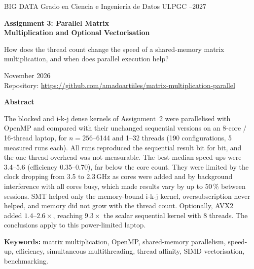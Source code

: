 \documentclass[11pt,a4paper]{article}
\newcommand{\AuthorName}{Amado Artiles Rodríguez}
\newcommand{\RepoURL}{https://github.com/amadoartiiles/matrix-multiplication-parallel}
\begin{document}
\thispagestyle{empty}
\begin{tcolorbox}[enhanced,colback=accent,colframe=accent,coltext=white,arc=3pt,
  left=14pt,right=14pt,top=12pt,bottom=12pt]
{\small BIG DATA \quad\textperiodcentered\quad Grado en Ciencia e Ingeniería de Datos \quad\textperiodcentered\quad ULPGC \quad\textperiodcentered{}--2027}

\vspace{8pt}
{\LARGE\bfseries Assignment 3: Parallel Matrix\\[2pt] Multiplication and Optional Vectorisation}

\vspace{8pt}
{\large How does the thread count change the speed of a shared-memory matrix multiplication,
and when does parallel execution help?}
\end{tcolorbox}

\vspace{4pt}
\noindent{\large\bfseries \AuthorName}\hfill{\color{codecomment}November 2026}\\
{\small Repository: \url{\RepoURL}}

\vspace{6pt}
\begin{infobox}
{\color{accent}\bfseries Abstract}\par\vspace{3pt}
The blocked and i-k-j dense kernels of Assignment~2 were parallelised with OpenMP and compared
with their unchanged sequential versions on an 8-core / 16-thread laptop, for $n=256$--6144
and 1--32 threads (190 configurations, 5 measured runs each). All runs reproduced the
sequential result bit for bit, and the one-thread overhead was not measurable. The best
median speed-ups were 3.4--5.6 (efficiency 0.35--0.70), far below the core count. They were limited by the
clock dropping from 3.5 to 2.3\,GHz as cores were added and by background interference with
all cores busy, which made results vary by up to 50\,\% between sessions. SMT helped only the
memory-bound i-k-j kernel, oversubscription never helped, and memory did not grow with the
thread count. Optionally, AVX2 added $1.4$--$2.6\times$, reaching $9.3\times$ the scalar
sequential kernel with 8 threads. The conclusions apply to this power-limited laptop.

\vspace{4pt}
{\small\textbf{Keywords:} matrix multiplication, OpenMP, shared-memory parallelism, speed-up,
efficiency, simultaneous multithreading, thread affinity, SIMD vectorisation, benchmarking.}
\end{infobox}
\end{document}
